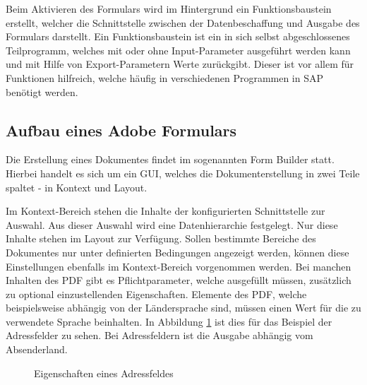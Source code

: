 Beim Aktivieren des Formulars wird im Hintergrund ein Funktionsbaustein erstellt, welcher die Schnittstelle zwischen der Datenbeschaffung und Ausgabe des Formulars darstellt. Ein Funktionsbaustein ist ein in sich selbst abgeschlossenes Teilprogramm, welches mit oder ohne Input-Parameter ausgeführt werden kann und mit Hilfe von Export-Parametern Werte zurückgibt. Dieser ist vor allem für Funktionen hilfreich, welche häufig in verschiedenen Programmen in SAP benötigt werden.

\subsection{Aufbau eines Adobe Formulars}
\label{ch:Aufbau}


Die Erstellung eines Dokumentes findet im sogenannten Form Builder statt. Hierbei handelt es sich um ein \ac{GUI}, welches die Dokumenterstellung in zwei Teile spaltet - in Kontext und Layout. 

Im Kontext-Bereich stehen die Inhalte der konfigurierten Schnittstelle zur Auswahl. Aus dieser Auswahl wird eine Datenhierarchie festgelegt. Nur diese Inhalte stehen im  Layout zur Verfügung. Sollen bestimmte Bereiche des Dokumentes nur unter definierten Bedingungen angezeigt werden, können diese Einstellungen ebenfalls im Kontext-Bereich vorgenommen werden. Bei manchen Inhalten des \ac{PDF} gibt es Pflichtparameter, welche ausgefüllt müssen, zusätzlich zu optional einzustellenden Eigenschaften.
 Elemente des \ac{PDF}, welche beispielsweise abhängig von der Ländersprache sind, müssen einen Wert für die zu verwendete Sprache beinhalten. In Abbildung \ref{figAD} ist dies für das Beispiel der Adressfelder zu sehen. Bei Adressfeldern ist die Ausgabe abhängig vom Absenderland.
 
 \begin{figure}[ht]
 	\centering
 	
 	\caption{Eigenschaften eines Adressfeldes}
 	\label{figAD}
 	
 \end{figure}

